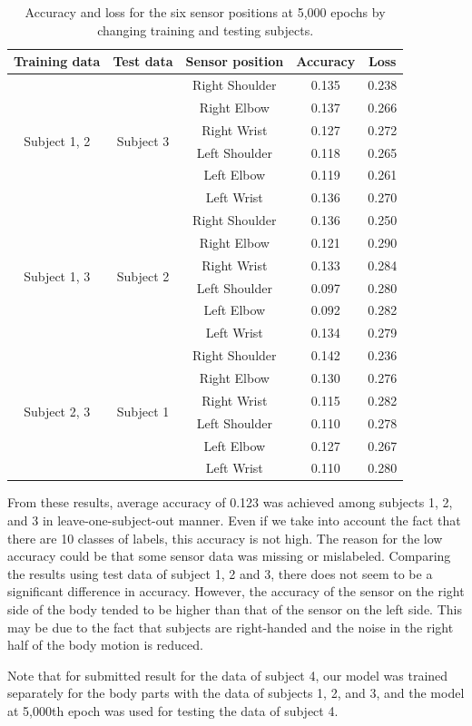 \documentclass[graybox]{svmult}
\begin{document}
\begin{table}[h]
    \centering
    \caption{Accuracy and loss for the six sensor positions at 5,000 epochs by changing training and testing subjects.}
    \label{tab:result}
    \begin{tabular}{c|c|c|c|c}\hline\hline
    Training data & Test data & Sensor position & Accuracy & Loss \\ \hline
    \multirow{6}{*}{Subject 1, 2} & \multirow{6}{*}{Subject 3} & Right Shoulder & 0.135 & 0.238 \\
    & & Right Elbow & 0.137 & 0.266 \\
    & & Right Wrist & 0.127 & 0.272 \\
    & & Left Shoulder & 0.118 & 0.265 \\
    & & Left Elbow & 0.119 & 0.261 \\
    & & Left Wrist & 0.136 & 0.270 \\ \cline{1-5}
    \multirow{6}{*}{Subject 1, 3} & \multirow{6}{*}{Subject 2} & Right Shoulder & 0.136 & 0.250 \\
    & & Right Elbow & 0.121 & 0.290 \\
    & & Right Wrist & 0.133 & 0.284 \\
    & & Left Shoulder & 0.097 & 0.280 \\
    & & Left Elbow & 0.092 & 0.282 \\
    & & Left Wrist & 0.134 & 0.279 \\ \cline{1-5}
    \multirow{6}{*}{Subject 2, 3} & \multirow{6}{*}{Subject 1} & Right Shoulder & 0.142 & 0.236 \\
    & & Right Elbow & 0.130 & 0.276 \\
    & & Right Wrist & 0.115 & 0.282 \\
    & & Left Shoulder & 0.110 & 0.278 \\
    & & Left Elbow & 0.127 & 0.267 \\
    & & Left Wrist & 0.110 & 0.280 \\ \hline
    \end{tabular}
\end{table}

From these results, average accuracy of 0.123 was achieved among subjects 1, 2, and 3 in leave-one-subject-out manner. Even if we take into account the fact that there are 10 classes of labels, this accuracy is not high. The reason for the low accuracy could be that some sensor data was missing or mislabeled. Comparing the results using test data of subject 1, 2 and 3, there does not seem to be a significant difference in accuracy. However, the accuracy of the sensor on the right side of the body tended to be higher than that of the sensor on the left side. This may be due to the fact that subjects are right-handed and the noise in the right half of the body motion is reduced.\par
Note that for submitted result for the data of subject 4, our model was trained separately for the body parts with the data of subjects 1, 2, and 3, and the model at 5,000th epoch was used for testing the data of subject 4.
\end{document}
